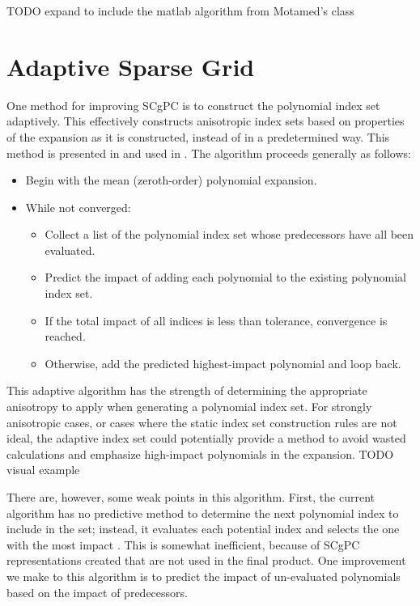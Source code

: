 TODO expand to include the matlab algorithm from Motamed's class


\section{Adaptive Sparse Grid}
One method for improving SCgPC is to construct the polynomial index set adaptively.  This effectively
constructs anisotropic index sets based on properties of the expansion as it is constructed, instead of in a
predetermined way.  This method is presented in \cite{Gerstner} and used in \cite{Ayres}.  The algorithm
proceeds generally as follows:
\begin{itemize}
  \item Begin with the mean (zeroth-order) polynomial expansion.
  \item While not converged:
    \begin{itemize}
      \item Collect a list of the polynomial index set whose predecessors have all been evaluated.
      \item Predict the impact of adding each polynomial to the existing polynomial index set.
      \item If the total impact of all indices is less than tolerance, convergence is reached.
      \item Otherwise, add the predicted highest-impact polynomial and loop back.
    \end{itemize}
\end{itemize}
This adaptive algorithm has the strength of determining the appropriate anisotropy to apply when generating a
polynomial index set.  For strongly  anisotropic cases, or cases where the static index set construction rules are not
ideal, the adaptive index set could potentially provide a method to avoid wasted calculations and emphasize
high-impact polynomials in the expansion.
TODO visual example

There are, however, some weak points in this algorithm.  First, the current algorithm has no predictive method
to determine the next polynomial index to include in the set; instead, it evaluates each potential index and
selects the one with the most impact \cite{Ayres}.  This is somewhat inefficient, because of SCgPC representations created
that are not used in the final product.  One improvement we make to this algorithm is to predict the impact of
un-evaluated polynomials based on the impact of predecessors.


